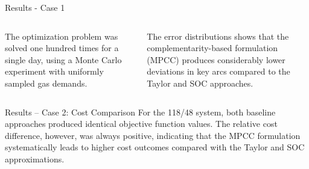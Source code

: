 \documentclass[hyperref={colorlinks,citecolor=blue,linkcolor=blue,urlcolor=blue}]{beamer}
\newlength\figureheight
\newlength\figurewidth
\begin{document}
\begin{frame}{Results - Case 1}
\scriptsize
\begin{columns}[t,onlytextwidth]
    \begin{column}{0.48\textwidth} 
        \justifying
        The optimization problem was solved one hundred times for a single day, using a Monte Carlo experiment with uniformly sampled gas demands.       
        \vspace{3.5em}
        \begin{figure}[!htb]
            \centering
            \setlength{}        
            \setlength{}
            
            \label{fig:blue_test_cost}
\end{figure}
    \end{column}
    
    \begin{column}{0.48\textwidth}
        \justifying
        The error distributions shows that the complementarity-based formulation (MPCC) produces considerably lower deviations in key arcs compared to the Taylor and SOC approaches.
        \vspace{2.5em}
        \begin{figure}[!htb]
            \centering
            \setlength{}        
            \setlength{}
            
            \label{fig:blue_test_boxplot}
        \end{figure}
    \end{column}
\end{columns}
\end{frame}



\begin{frame}{Results – Case 2: Cost Comparison}
\footnotesize
\justifying
For the 118/48 system, both baseline approaches produced identical objective 
function values. The relative cost difference, however, was always positive, 
indicating that the MPCC formulation systematically leads to higher cost 
outcomes compared with the Taylor and SOC approximations. 

\vspace{0.5em}
\begin{figure}[!htb]
    \centering
    \setlength{}        
    \setlength{}
    
    \label{fig:green_test_cost}
\end{figure}
\end{frame}
\end{document}
